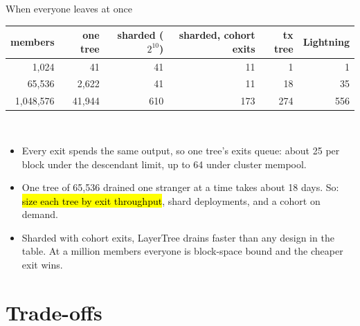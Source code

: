 \documentclass[aspectratio=169,10pt]{beamer}
\begin{document}
\begin{frame}{When everyone leaves at once}
  \small
  \centering
  \begin{tabular}{@{}rrrrrr@{}}
    \toprule
    members & one tree & sharded ($2^{10}$) & sharded, cohort exits & tx tree & Lightning \\ \midrule
    1,024 & 41 & 41 & 11 & 1 & 1 \\
    65,536 & 2,622 & 41 & 11 & 18 & 35 \\
    1,048,576 & 41,944 & 610 & 173 & 274 & 556 \\
    \bottomrule
  \end{tabular}\\[0.3em]
  {\scriptsize{}}
  \vspace{0.8em}
  \begin{itemize}
    \item Every exit spends the same output, so one tree's exits queue: about 25 per block under the descendant limit, up to 64 under cluster mempool.
    \item One tree of 65,536 drained one stranger at a time takes about 18 days. So: \hl{size each tree by exit throughput}, shard deployments, and  a cohort on demand.
    \item Sharded with cohort exits, LayerTree drains faster than any design in the table. At a million members everyone is block-space bound and the cheaper exit wins.
  \end{itemize}
\end{frame}

\section{Trade-offs}
\end{document}
